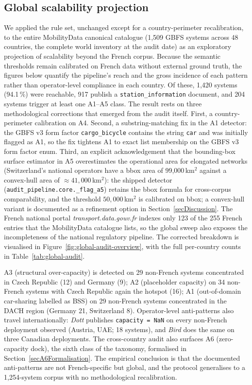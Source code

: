 \documentclass[11pt,a4paper]{article}
\begin{document}
\subsection{Global scalability projection}\label{secGlobalAudit}
We applied the rule set, unchanged except for a country-perimeter
recalibration, to the entire MobilityData canonical catalogue
(1{,}509 GBFS systems across 48 countries, the complete world inventory at
the audit date) as an exploratory projection of scalability beyond the
French corpus. Because the semantic thresholds remain calibrated on French
data without external ground truth, the figures below quantify the
pipeline's reach and the gross incidence of each pattern rather than
operator-level compliance in each country. Of these, 1{,}420 systems
(94.1\,\%) were reachable, 917 publish a \texttt{station\_information}
document, and 204 systems trigger at least one A1--A5 class. The result
rests on three methodological corrections that emerged from the audit
itself. First, a country-perimeter calibration on A4. Second, a
substring-matching fix in the A1 detector: the GBFS v3 form factor
\texttt{cargo\_bicycle} contains the string \texttt{car} and was
initially flagged as A1, so the fix tightens A1 to exact list
membership on the GBFS v3 form factor enum. Third, an explicit
acknowledgement that the bounding-box surface estimator in A5
overestimates the operational area for elongated networks
(Switzerland's national operators have a bbox area of
99{,}000\,km$^2$ against a convex-hull area of
$\approx 41{,}000$\,km$^2$): the shipped detector
(\texttt{audit\_pipeline.core.\_flag\_a5}) retains the bbox formula
for cross-corpus comparability, and the threshold
$50{,}000$\,km$^2$ is calibrated on bbox; a convex-hull
variant is documented as a refinement option in
Section~\ref{secDiscussion}. The French
national portal \emph{transport.data.gouv.fr} indexes only 123 of
the 255 French entries that the MobilityData catalogue lists, so
the global sweep also exposes the incompleteness of the national
regulatory pipeline. The corrected breakdown is visualised in
Figure~\ref{fig:global-audit-overview}, with the full per-country
counts in Table~\ref{tab:global-audit}.

A3 (structural over-capacity) is detected on 29 non-French systems
concentrated in Czech Republic (12) and Germany (9); A2 (placeholder
capacity) on 34 non-French systems with Czech Republic again the
hotspot (16); A1 (out-of-domain car-sharing labelled as BSS) on 29
non-French systems concentrated in the DACH region (Germany 21,
Switzerland 8). Operator-level anti-patterns also travel
internationally: \emph{Dott} publishes \texttt{capacity = NaN} on
every non-French deployment observed (Austria, UAE; 18 systems),
and \emph{Bird} does the same on three Canadian deployments. The
cross-country audit also surfaces A6 (zero-capacity dock),
the sixth class of the taxonomy, formalised in
Section~\ref{secA6Formalisation}. The empirical conclusion is that
the documented anti-patterns are not French-specific but global,
and the protocol generalises to a 1{,}254-system corpus with no
methodological recalibration.
\end{document}
